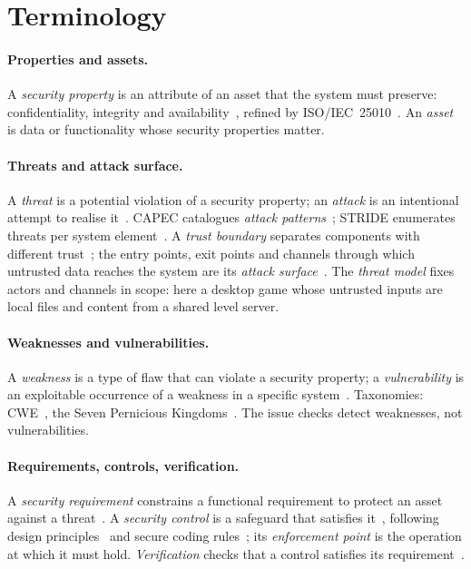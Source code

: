 \section{Terminology}
\label{sec:terminology}

\paragraph{Properties and assets.}
A \emph{security property} is an attribute of an asset that the system must
preserve: confidentiality, integrity and availability~\citep{avizienis2004},
refined by ISO/IEC~25010~\citep{iso25010}. An \emph{asset} is data or
functionality whose security properties matter.

\paragraph{Threats and attack surface.}
A \emph{threat} is a potential violation of a security property; an
\emph{attack} is an intentional attempt to realise it~\citep{rfc4949}.
CAPEC catalogues \emph{attack patterns}~\citep{capec}; STRIDE enumerates
threats per system element~\citep{shostack2014}. A \emph{trust boundary}
separates components with different trust~\citep{shostack2014}; the
entry points, exit points and channels through which untrusted data reaches
the system are its \emph{attack surface}~\citep{manadhata2011}. The
\emph{threat model} fixes actors and channels in scope: here a desktop game
whose untrusted inputs are local files and content from a shared level server.

\paragraph{Weaknesses and vulnerabilities.}
A \emph{weakness} is a type of flaw that can violate a security property; a
\emph{vulnerability} is an exploitable occurrence of a weakness in a specific
system~\citep{cwe,cve}. Taxonomies: CWE~\citep{cwe}, the Seven Pernicious
Kingdoms~\citep{tsipenyuk2005}. The issue checks detect weaknesses, not
vulnerabilities.

\paragraph{Requirements, controls, verification.}
A \emph{security requirement} constrains a functional requirement to protect
an asset against a threat~\citep{haley2008,firesmith2003,sindre2005}. A
\emph{security control} is a safeguard that
satisfies it~\citep{nist80053}, following design
principles~\citep{saltzer1975} and secure coding rules~\citep{long2011}; its
\emph{enforcement point} is the operation at which it must hold.
\emph{Verification} checks that a control satisfies its
requirement~\citep{asvs5,nist800218}.

